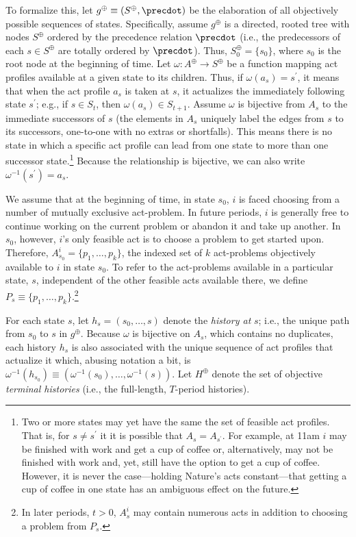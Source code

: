 \documentclass[
11pt,
titlepage,
reqno,
]{article}%
\theoremstyle{definition}
\begin{document}
To formalize this,  let $g^\oplus\equiv( S^\oplus,\precdot)$ be the elaboration of all objectively possible sequences of states.
Specifically, assume $g^\oplus$ is a directed, rooted tree with nodes $S^\oplus$ ordered by the precedence relation $\precdot$ (i.e., the predecessors of each $s\in S^\oplus$ are totally ordered by $\precdot$). 
Thus, $S^\oplus_0=\{s_0\}$, where $s_0$ is the root node at the beginning of time.
Let $\omega:A^\oplus\rightarrow S^\oplus$ be a function mapping act profiles available at a given state to its children.	
Thus, if $\omega(a_s)=s^\prime$, it means that when the act profile $a_s$ is taken at $s$, it actualizes the immediately following state $s^\prime$; e.g., if $s\in S_t$, then $\omega(a_s)\in S_{t+1}$.
Assume $\omega$ is bijective from $A_s$ to the immediate successors of $s$ (the elements in $A_s$ uniquely label the edges from $s$ to its successors, one-to-one with no extras or shortfalls).
This means there is no state in which a specific act profile can lead from one state to more than one successor state.\footnote
{ 
	Two or more states may yet have the same the set of feasible act profiles. That is, for $s\ne s^\prime$ it it is possible that $A_s=A_{s^\prime}$. For example, at 11am $i$ may be finished with  work and get a cup of coffee or, alternatively, may not be finished with work and, yet, still have the option to get a cup of coffee. However, it is never the case---holding Nature's acts constant---that getting a cup of coffee in one state has an ambiguous effect on the future.
}
Because the relationship is bijective, we can also write $\omega^{-1}(s^\prime)=a_s$.

We assume that at the beginning of time, in state $s_0$, $i$ is faced choosing from  a number of mutually exclusive act-problem.
In future periods, $i$ is generally free to continue working on the current problem or abandon it and take up another. 
In $s_0$, however, $i$'s only feasible act is to choose a problem to get started upon. 
Therefore, $A^i_{s_0}=\{p_1,\ldots,p_k\}$, the indexed set of $k$ act-problems objectively available to $i$ in state $s_0$.
To refer to the act-problems available in a particular state, $s$, independent of the other feasible acts available there, we define $P_s\equiv \{p_1,\ldots,p_k\}$.\footnote
{
	In later periods, $t>0$, $A^i_s$ may contain numerous acts in addition to choosing a problem from $P_s$.
}
	
For each state $s$, let $h_s=(s_0,\ldots,s)$ denote the \textit{history at} $s$; i.e., the unique path from $s_0$ to $s$ in $g^\oplus$.
Because $\omega$ is bijective on $A_s$, which contains no duplicates, each history $h_s$ is also associated with the unique sequence of act profiles that actualize it which, abusing notation a bit, is  $\omega^{-1}(h_{s_0})\equiv(\omega^{-1}(s_0),\ldots,\omega^{-1}(s))$.
Let $H^\oplus$ denote the set of objective \textit{terminal histories} (i.e., the full-length, $T$-period histories).
	
\end{document}
